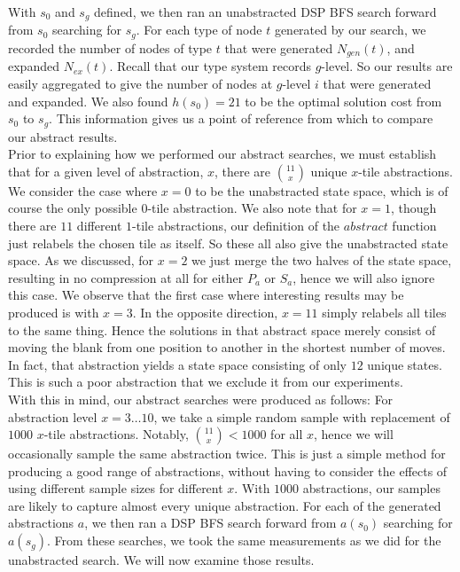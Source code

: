 \documentclass{article}
\begin{document}
With \(s_0\) and \(s_g\) defined, we then ran an unabstracted DSP BFS search
forward from \(s_0\) searching for \(s_g\).
For each type of node \(t\) generated by our search,
we recorded the number of nodes of type \(t\) that were generated \(N_{gen}(t)\),
and expanded \(N_{ex}(t)\). Recall that our type system records \(g\)-level.
So our results are easily aggregated to give the number of nodes
at \(g\)-level \(i\) that were generated and expanded.
We also found \(h(s_0) = 21\) to be the optimal solution cost from \(s_0\) to \(s_g\).
This information gives us a point of reference from which to compare our abstract results. \\

Prior to explaining how we performed our abstract searches,
we must establish that for a given level of abstraction, \(x\),
there are \({11}\choose{x}\) unique \(x\)-tile abstractions.
We consider the case where \(x = 0\) to be the unabstracted state space,
which is of course the only possible \(0\)-tile abstraction.
We also note that for \(x = 1\), though there are \(11\) different \(1\)-tile abstractions,
our definition of the \(abstract\) function just relabels the chosen tile as itself.
So these all also give the unabstracted state space.
As we discussed, for \(x = 2\) we just merge the two halves of the state space, resulting
in no compression at all for either \(P_a\) or \(S_a\), hence we will also ignore this case.
We observe that the first case where interesting results may be produced
is with \(x = 3\). In the opposite direction, \(x = 11\) simply relabels all tiles
to the same thing. Hence the solutions in that abstract space merely
consist of moving the blank from one position to another in the shortest
number of moves.
In fact, that abstraction yields a state space consisting of only \(12\) unique states.
This is such a poor abstraction that we exclude it from our experiments. \\

With this in mind, our abstract searches were produced as follows:
For abstraction level \(x = 3 \ldots 10\),
we take a simple random sample with replacement of \(1000\) \(x\)-tile abstractions.
Notably, \({{11}\choose{x}} < 1000\) for all \(x\), hence we will occasionally
sample the same abstraction twice.
This is just a simple method for producing a good range of abstractions,
without having to consider the effects of using different sample sizes for different \(x\).
With \(1000\) abstractions, our samples are likely to capture almost every unique abstraction.
For each of the generated abstractions \(a\), we then ran a DSP BFS search forward
from \(a(s_0)\) searching for \(a(s_g)\). From these searches,
we took the same measurements as we did for the unabstracted search.
We will now examine those results.
\end{document}
